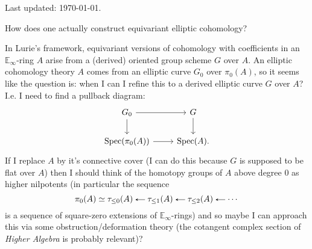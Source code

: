 



\thispagestyle{fancy}


\begin{flushleft}
  Last updated: \today.
\end{flushleft}

\medskip

\begin{idea}
\item How does one actually construct equivariant elliptic cohomology?
  \begin{idea}
    \renewcommand{\E}{\mathbb{E}}
  \item In Lurie's framework, equivariant versions of cohomology with
    coefficients in an $\E_\infty$-ring $A$ arise from a (derived)
    oriented group scheme $G$ over $A$. An elliptic cohomology theory
    $A$ comes from an elliptic curve $G_0$ over $\pi_0(A)$, so it
    seems like the question is: when I can I refine this to a derived
    elliptic curve $G$ over $A$? I.e. I need to find a pullback
    diagram: \newcommand{\Spec}{\operatorname{Spec}}
    \[
    \begin{tikzcd}
      G_0 \ar[r] \ar[d] & G \ar[d] \\
      \Spec(\pi_0(A)) \ar[r] & \Spec(A).
    \end{tikzcd}
    \]
    If I replace $A$ by it's connective cover (I can do this because
    $G$ is supposed to be flat over $A$) then I should think of the
    homotopy groups of $A$ above degree $0$ as higher nilpotents (in
    particular the sequence
    \[
    \pi_0(A) \iso \tau_{\le 0}(A) \from \tau_{\le 1}(A) \from
    \tau_{\le 2}(A) \from \cdots
    \]
    is a sequence of square-zero extensions of $\E_\infty$-rings) and
    so maybe I can approach this via some obstruction/deformation
    theory (the cotangent complex section of \emph{Higher Algebra} is
    probably relevant)?
  \end{idea}
\end{idea}




